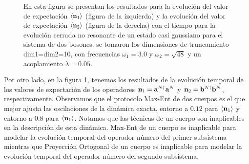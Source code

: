 \documentclass{report} %
\newcommand{\lgg}{\langle}
\newcommand{\rgg}{\rangle}
\numberwithin{equation}{section}
\begin{document}
\begin{figure}
    \centering
    \qquad
    \caption{En esta figura se presentan los resultados para la evolución del valor de expectación $\lgg {\bf n}_1 \rgg$ (figura de la izquierda) y la evolución del valor de expectación $\lgg {\bf n}_2 \rgg$ (figura de la derecha) con el tiempo para la evolución cerrada no resonante de un estado casi gaussiano para el sistema de dos bosones. se tomaron los dimensiones de truncamiento dim1=dim2=10, con frecuencias $\omega_1 = 3.0$ y $\omega_2 =\sqrt{48}$ y un acoplamiento $\lambda = 0.05$.}
    \label{ocupations_closed_nonres}
\end{figure}

Por otro lado, en la figura \ref{ocupations_closed_nonres}, tenemos los resultados de la evolución temporal de los valores de expectación de los operadores ${\bf n}_1 = {\bf a}^{N\dagger} {\bf a}^{N}$ y ${\bf n}_2 = {\mathbf b}^{N\dagger} {\mathbf b}^{N}$, respectivamente. 
Observamos que el protocolo Max-Ent de dos cuerpos es el que mejor ajusta las oscilaciones de la dinámica exacta, entorno a $0.12$ para $\langle{\bf n}_1\rangle$ y entorno a $0.8$ para $\langle{\bf n}_1\rangle$. Notamos que las técnicas de un cuerpo son inaplicables en la descripción de esta dinámica. Max-Ent de un cuerpo es inaplicable para modelar la evolución temporal del operador número del primer subsistema mientras que Proyección Ortogonal de un cuerpo es inaplicable para modelar la evolución temporal del operador número del segundo subsistema.\\
\end{document}
